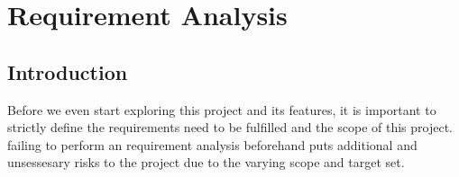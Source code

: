 \chapter{Requirement Analysis}
	
	\section{Introduction}
		Before we even start exploring this project and its features, it is important to strictly define the requirements need to be fulfilled and the
		scope of this project. failing to perform an requirement analysis beforehand puts additional and unsessesary risks to the project due to the
		varying scope and target set.

